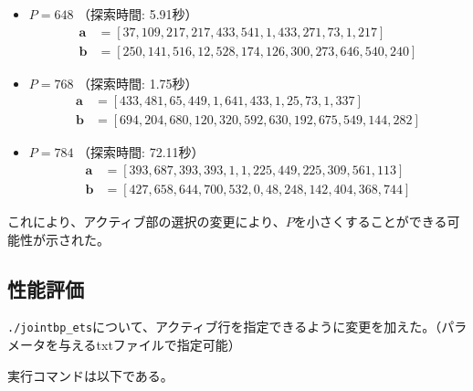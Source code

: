 \documentclass[a4paper,11pt,dvipdfmx]{jsarticle}
\theoremstyle{definition}
\begin{document}
\begin{itemize}
    \item \textbf{$P = 648$} （探索時間: 5.91秒）
    \begin{align*}
        \bm{a} &= [37, 109, 217, 217, 433, 541, 1, 433, 271, 73, 1, 217] \\
        \bm{b} &= [250, 141, 516, 12, 528, 174, 126, 300, 273, 646, 540, 240]
    \end{align*}

    \item \textbf{$P = 768$} （探索時間: 1.75秒）
    \begin{align*}
        \bm{a} &= [433, 481, 65, 449, 1, 641, 433, 1, 25, 73, 1, 337] \\
        \bm{b} &= [694, 204, 680, 120, 320, 592, 630, 192, 675, 549, 144, 282]
    \end{align*}

    \item \textbf{$P = 784$} （探索時間: 72.11秒）
    \begin{align*}
        \bm{a} &= [393, 687, 393, 393, 1, 1, 225, 449, 225, 309, 561, 113] \\
        \bm{b} &= [427, 658, 644, 700, 532, 0, 48, 248, 142, 404, 368, 744]
    \end{align*}
\end{itemize}
これにより、アクティブ部の選択の変更により、$P$を小さくすることができる可能性が示された。

\subsection{性能評価}
\texttt{./jointbp\_ets}について、アクティブ行を指定できるように変更を加えた。（パラメータを与えるtxtファイルで指定可能）

実行コマンドは以下である。
\end{document}
